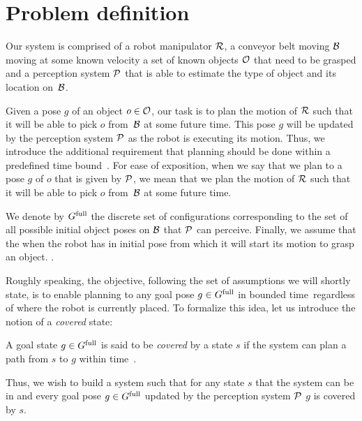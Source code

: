 \documentclass[conference]{IEEEtran}
\begin{document}
\section{Problem definition}

Our system is comprised of 
a robot manipulator $\mathcal{R}$,
a conveyor belt moving $\mathcal{B}$ moving at some known velocity
a set of known objects $\mathcal{O}$ that need to be grasped and 
a perception system $\mathcal{P}$ that is able to estimate the type of object and its location on~$\mathcal{B}$.

Given a pose $g$ of an object $o \in \mathcal{O}$, our task is to plan the motion of $\mathcal{R}$ such that it will be able to pick $o$ from~$\mathcal{B}$ at some future time.
%
This pose $g$ will be updated by the perception system $\mathcal{P}$ as the robot is executing its motion. Thus, we introduce the additional requirement that planning should be done within a predefined time bound~\Tbound.
%
For ease of exposition, when we say that we plan to a pose $g$ of $o$ that is given by $\mathcal{P}$, 
we mean that we plan the motion of $\mathcal{R}$ such that it will be able to pick $o$ from~$\mathcal{B}$ at some future time. 

%
We denote by $G^{\textrm{full}}$ the discrete set of configurations corresponding to the set of all possible initial object poses on $\mathcal{B}$ that $\mathcal{P}$ can perceive.
%
Finally, we assume that the when the robot has in initial pose \Shome from which it will start its motion to grasp an object.
.

Roughly speaking, the objective, following the set of assumptions we will shortly state, is to enable planning to any goal pose $ g \in G^{\textrm{full}}$ in bounded time~\Tbound regardless of where the robot is currently placed.
To formalize this idea, let us introduce the notion of a \emph{covered} state:
\begin{definition}
    A goal state $g \in G^{\textrm{full}}$ is said to be \emph{covered} by a state $s$ if 
    the system can plan a path from $s$ to $g$ within time~\Tbound.
\end{definition}

Thus, we wish to build a system such that 
for any state $s$ that the system can be in 
and every goal pose $g \in G^{\textrm{full}}$ updated by the perception system $\mathcal{P}$
$g$ is covered by $s$.
\end{document}
